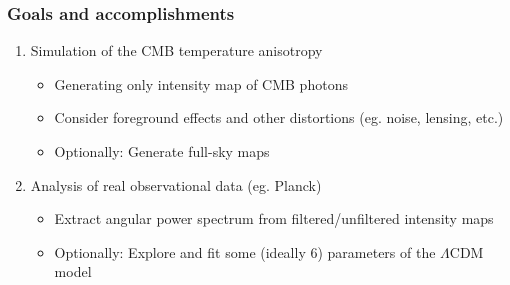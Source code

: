 \begin{frame}
\frametitle{Goals and accomplishments}

\begin{enumerate}
	\item<1-> Simulation of the CMB temperature anisotropy
	\begin{itemize}
		\item<1-> Generating only intensity map of CMB photons
		\item<1-> Consider foreground effects and other distortions (eg. noise, lensing, etc.)
		\item<1-> Optionally: Generate full-sky maps
	\end{itemize}
	\item<2-> Analysis of real observational data (eg. Planck)
	\begin{itemize}
		\item<2-> Extract angular power spectrum from filtered/unfiltered intensity maps
		\item<2-> Optionally: Explore and fit some (ideally $6$) parameters of the $\Lambda$CDM model
	\end{itemize}
\end{enumerate}

\end{frame}